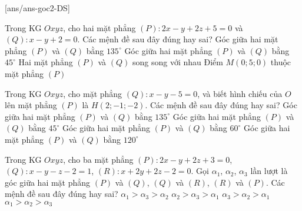 \TNTF
{}[ans/ans-goc2-DS]
\begin{ex}%
	Trong KG $Oxyz$, cho hai mặt phẳng $(P)\colon 2x-y+2z+5=0$ và $(Q)\colon x-y+2=0$. Các mệnh đề sau đây đúng hay sai?
	\choiceTF
	{Góc giữa hai mặt phẳng $(P)$ và $(Q)$ bằng $135^\circ$}
	{\True Góc giữa hai mặt phẳng $(P)$ và $(Q)$ bằng $45^\circ$}
	{Hai mặt phẳng $(P)$ và $(Q)$ song song với nhau}
	{\True Điểm $M\left(0;5;0\right)$ thuộc mặt phẳng $(P)$}
\end{ex}
\begin{ex}%
Trong KG $Oxyz$, cho mặt phẳng $(Q)\colon x-y-5=0$, và biết hình chiếu của $O$ lên mặt phẳng $(P)$ là $H\left(2;-1;-2\right)$. Các mệnh đề sau đây đúng hay sai?
	\choiceTF
{Góc giữa hai mặt phẳng $(P)$ và $(Q)$ bằng $135^\circ$}
{\True Góc giữa hai mặt phẳng $(P)$ và $(Q)$ bằng $45^\circ $}
{Góc giữa hai mặt phẳng $(P)$ và $(Q)$ bằng $60^\circ $}
{Góc giữa hai mặt phẳng $(P)$ và $(Q)$ bằng $120^\circ$}
\end{ex}
\begin{ex}%
	Trong KG $Oxyz$, cho ba mặt phẳng $(P)\colon 2x-y+2z+3=0$, $(Q)\colon x-y-z-2=1$, $(R)\colon x+2y+2z-2=0$. Gọi $\alpha_1$, $\alpha_2$, $\alpha_3$ lần lượt là góc giữa hai mặt phẳng $(P)$ và $(Q)$, $(Q)$ và $(R)$, $(R)$ và $(P)$. Các mệnh đề sau đây đúng hay sai?
	\choiceTF
	{\True $\alpha_1>\alpha_3>\alpha_2$}
	{$\alpha_2>\alpha_3>\alpha_1$}
	{$\alpha_3>\alpha_2>\alpha_1$}
	{$\alpha_1>\alpha_2>\alpha_3$}
\end{ex}

